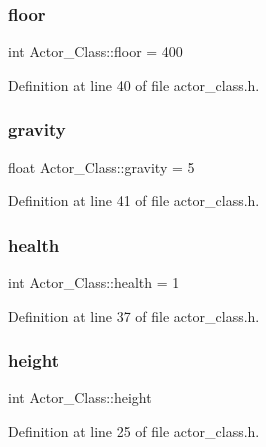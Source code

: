 \subsubsection{\texorpdfstring{floor}{floor}}
{\footnotesize\ttfamily int Actor\+\_\+\+Class\+::floor = 400}



Definition at line 40 of file actor\+\_\+class.\+h.

\hypertarget{class_actor___class_a9da6be86a6bac1e8bd4ba051fbad7eee}{}\label{class_actor___class_a9da6be86a6bac1e8bd4ba051fbad7eee} 
\subsubsection{\texorpdfstring{gravity}{gravity}}
{\footnotesize\ttfamily float Actor\+\_\+\+Class\+::gravity = 5}



Definition at line 41 of file actor\+\_\+class.\+h.

\hypertarget{class_actor___class_adfbd9eb605a74c1a9d9da3df90a92aea}{}\label{class_actor___class_adfbd9eb605a74c1a9d9da3df90a92aea} 
\subsubsection{\texorpdfstring{health}{health}}
{\footnotesize\ttfamily int Actor\+\_\+\+Class\+::health = 1}



Definition at line 37 of file actor\+\_\+class.\+h.

\hypertarget{class_actor___class_ac1ceeec9b55fe7cb6c657b3cf1aa81dd}{}\label{class_actor___class_ac1ceeec9b55fe7cb6c657b3cf1aa81dd} 
\subsubsection{\texorpdfstring{height}{height}}
{\footnotesize\ttfamily int Actor\+\_\+\+Class\+::height}



Definition at line 25 of file actor\+\_\+class.\+h.

\hypertarget{class_actor___class_a183384213048a1b5a8b62ca1de090ae2}{}\label{class_actor___class_a183384213048a1b5a8b62ca1de090ae2} 
